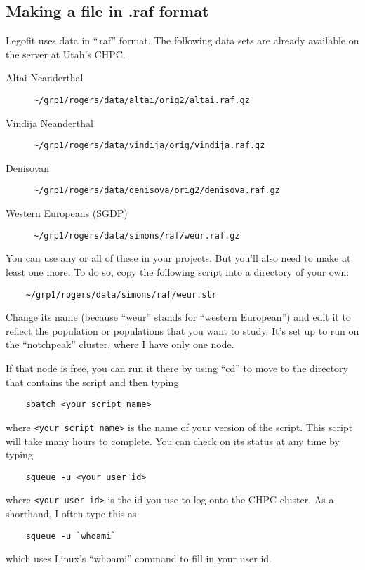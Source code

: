 \documentclass[11pt]{article}
\begin{document}
\subsection{Making a file in .raf format}
Legofit uses data in ``.raf'' format. The following data sets are
already available on the server at Utah's CHPC.
\begin{description}
\item[Altai Neanderthal]
\verb|~/grp1/rogers/data/altai/orig2/altai.raf.gz|

\item[Vindija Neanderthal]
\verb|~/grp1/rogers/data/vindija/orig/vindija.raf.gz|

\item[Denisovan]
\verb|~/grp1/rogers/data/denisova/orig2/denisova.raf.gz|

\item[Western Europeans (SGDP)]
\verb|~/grp1/rogers/data/simons/raf/weur.raf.gz|
\end{description}
You can use any or all of these in your projects. But you'll also need
to make at least one more. To do so, copy the following
\href{https://alanrogers.github.io/agar22/legofit/weur.slr.html}{script}
into a directory of your own:
\begin{verbatim}
    ~/grp1/rogers/data/simons/raf/weur.slr
\end{verbatim}
Change its name (because ``weur'' stands for ``western European'') and
edit it to reflect the population or populations that you want to
study. It's set up to run on the ``notchpeak'' cluster, where I have
only one node.

If that node is free, you can run it there by using ``cd'' to move to
the directory that contains the script and then typing
\begin{verbatim}
    sbatch <your script name>
\end{verbatim}
where \verb|<your script name>| is the name of your version of the
script. This script will take many hours to complete. You can check on
its status at any time by typing
\begin{verbatim}
    squeue -u <your user id>
\end{verbatim}
where \verb|<your user id>| is the id you use to log onto the CHPC cluster.
As a shorthand, I often type this as
\begin{verbatim}
    squeue -u `whoami`
\end{verbatim}
which uses Linux's ``whoami'' command to fill in your user id.
\end{document}
